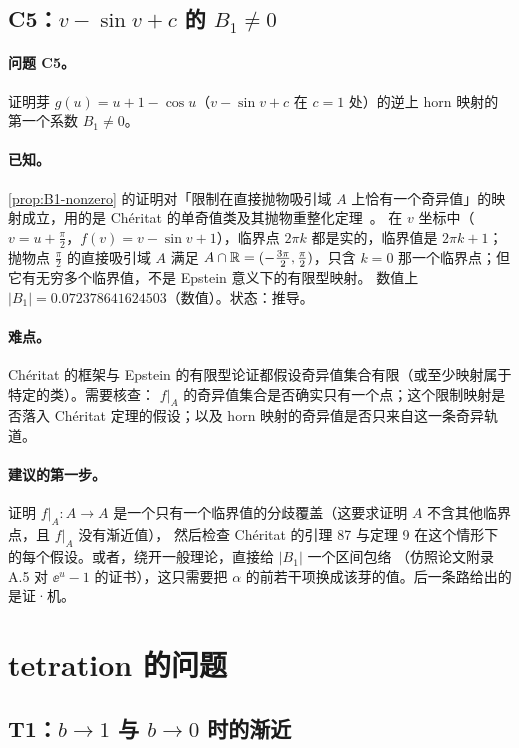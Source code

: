 \subsection{C5：$v-\sin v+c$ 的 $B_1\neq0$}\label{ch12:sec:C5}

\paragraph{问题 C5。}证明芽 $g(u)=u+1-\cos u$（$v-\sin v+c$ 在 $c=1$ 处）的逆上 horn 映射的第一个系数 $B_1\neq0$。

\paragraph{已知。}\cref{prop:B1-nonzero} 的证明对「限制在直接抛物吸引域 $A$ 上恰有一个奇异值」的映射成立，用的是 Chéritat 的单奇值类及其抛物重整化定理~\cite{Cheritat2022}。
在 $v$ 坐标中（$v=u+\tfrac\pi2$，$f(v)=v-\sin v+1$），临界点 $2\pi k$ 都是实的，临界值是 $2\pi k+1$；抛物点 $\tfrac\pi2$ 的直接吸引域 $A$ 满足 $A\cap\mathbb{R}=(-\tfrac{3\pi}2,\tfrac\pi2)$，只含 $k=0$ 那一个临界点；但它有无穷多个临界值，不是 Epstein 意义下的有限型映射。
数值上 $|B_1|=0.072378641624503$（数值）。状态：推导。

\paragraph{难点。}Chéritat 的框架与 Epstein 的有限型论证都假设奇异值集合有限（或至少映射属于特定的类）。需要核查：
$f|_A$ 的奇异值集合是否确实只有一个点；这个限制映射是否落入 Chéritat 定理的假设；以及 horn 映射的奇异值是否只来自这一条奇异轨道。

\paragraph{建议的第一步。}证明 $f|_A:A\to A$ 是一个只有一个临界值的分歧覆盖（这要求证明 $A$ 不含其他临界点，且 $f|_A$ 没有渐近值），
然后检查 Chéritat 的引理 87 与定理 9 在这个情形下的每个假设。或者，绕开一般理论，直接给 $|B_1|$ 一个区间包络
（仿照论文附录 A.5 对 $\ee^u-1$ 的证书），这只需要把 $\alpha$ 的前若干项换成该芽的值。后一条路给出的是证·机。

\section{tetration 的问题}\label{ch12:sec:tetration}

\subsection{T1：$b\to1$ 与 $b\to0$ 时的渐近}\label{ch12:sec:T1}

